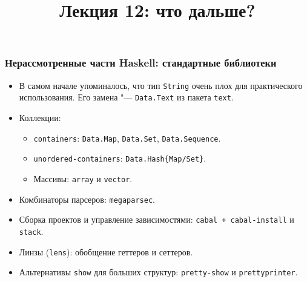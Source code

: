 \documentclass[11pt]{beamer}
\title{Лекция 12: что дальше?}
\begin{document}
\begin{frame}[plain]
    \maketitle
\end{frame}

\begin{frame}[fragile]
\frametitle{Нерассмотренные части Haskell: стандартные библиотеки}
\begin{itemize}
    \item В самом начале упоминалось, что тип \lstinline{String} очень плох для практического использования. Его замена "--- \lstinline{Data.Text} из пакета \lstinline|text|.
    \item Коллекции: 
    \begin{itemize}
        \item \lstinline|containers|: \lstinline|Data.Map|, \lstinline|Data.Set|, \lstinline|Data.Sequence|.
        \item \lstinline|unordered-containers|: \lstinline|Data.Hash{Map/Set}|.
        \item Массивы: \lstinline|array| и \lstinline|vector|.
    \end{itemize}
    \item Комбинаторы парсеров: \lstinline|megaparsec|.
    \item Сборка проектов и управление зависимостями: \lstinline|cabal + cabal-install| и \lstinline|stack|.
    \item Линзы (\lstinline|lens|): обобщение геттеров и сеттеров.
    \item Альтернативы \lstinline|show| для больших структур: \lstinline|pretty-show| и \lstinline|prettyprinter|.
\end{itemize}
\end{frame}
\end{document}
